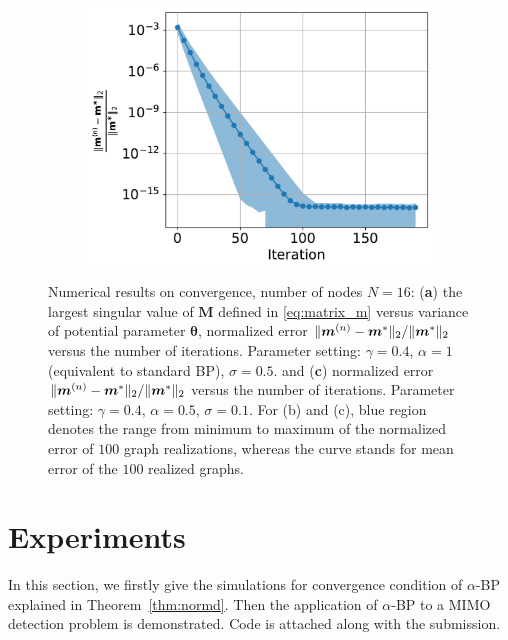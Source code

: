 \begin{figure}[!ht]
  \begin{subfigure}{0.5\textwidth}
    \includegraphics[width=1\columnwidth]{figures/converge/converge_erp0_4_alpha_0_5_stn_0_1_vs_filter_true_crop.pdf}
    \caption{}
    \label{fig:log-error-iter-converge}
  \end{subfigure}
  \caption{Numerical results on convergence, number of nodes $N=16$: (\textbf{a}) the largest singular value of $\bm{M}$ defined in \eqref{eq:matrix_m} versus variance of potential parameter $\bm{\theta}$, normalized error ${\| \bm{m}^{(n)}-\bm{m}^{\ast} \|_{2}}/{\| \bm{m}^{\ast} \|_{2}}$ versus the number of iterations. Parameter setting: $\gamma =
    0.4$, $\alpha = 1$ (equivalent to standard BP), $\sigma = 0.5$.
    and (\textbf{c}) normalized error
    ${\| \bm{m}^{(n)}-\bm{m}^{\ast} \|_{2}}/{\| \bm{m}^{\ast} \|_{2}}$
    versus the number of iterations. Parameter setting: $\gamma =
    0.4$, $\alpha = 0.5$, $\sigma = 0.1$.
    For (b) and (c), blue region denotes the range from minimum to maximum of the normalized error of $100$ graph realizations, whereas the curve stands for mean error of the $100$ realized graphs. }
  \label{fig:mimo_detection}
  
\end{figure}


\section{Experiments}

In this section, we firstly give the simulations for convergence condition of $\alpha$-BP explained in Theorem~\ref{thm:normd}. Then the application of $\alpha$-BP to a MIMO detection problem is demonstrated. {Code is attached along with the submission.}

